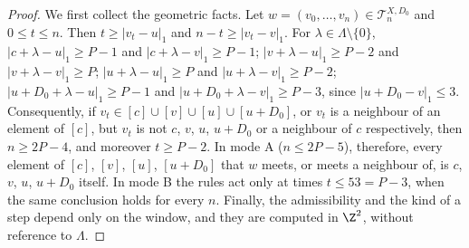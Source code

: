 \begin{proof}
We first collect the geometric facts. Let $w = (v_0, \dots, v_n) \in \mathcal T^{X, D_0}_n$ and $0 \le t \le n$. Then $t \ge |v_t - u|_1$ and $n - t \ge |v_t - v|_1$. For $\lambda \in \Lambda \setminus \{0\}$, $|c + \lambda - u|_1 \ge P - 1$ and $|c + \lambda - v|_1 \ge P - 1$; $|v + \lambda - u|_1 \ge P - 2$ and $|v + \lambda - v|_1 \ge P$; $|u + \lambda - u|_1 \ge P$ and $|u + \lambda - v|_1 \ge P - 2$; $|u + D_0 + \lambda - u|_1 \ge P - 1$ and $|u + D_0 + \lambda - v|_1 \ge P - 3$, since $|u + D_0 - v|_1 \le 3$. Consequently, if $v_t \in [c] \cup [v] \cup [u] \cup [u + D_0]$, or $v_t$ is a neighbour of an element of $[c]$, but $v_t$ is not $c$, $v$, $u$, $u + D_0$ or a neighbour of $c$ respectively, then $n \ge 2P - 4$, and moreover $t \ge P - 2$. In mode A ($n \le 2P - 5$), therefore, every element of $[c]$, $[v]$, $[u]$, $[u + D_0]$ that $w$ meets, or meets a neighbour of, is $c$, $v$, $u$, $u + D_0$ itself. In mode B the rules act only at times $t \le 53 = P - 3$, when the same conclusion holds for every $n$. Finally, the admissibility and the kind of a step depend only on the window, and they are computed in $\Z^2$, without reference to $\Lambda$.


\end{proof}
